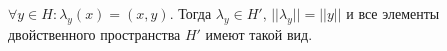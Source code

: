 \begin{to_thr}
	$\forall y \in H \colon \lambda_y(x) = (x,y)$. Тогда $\lambda_y \in H', \, ||\lambda_y|| = ||y||$ и все элементы двойственного пространства $H'$ имеют такой вид.
\end{to_thr}